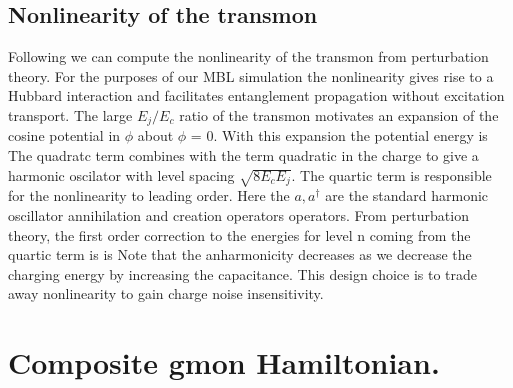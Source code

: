 \subsection{Nonlinearity of the transmon}
Following \cite{Koch2007, JimmyThesis} we can compute the nonlinearity of the transmon from perturbation theory.
For the purposes of our MBL simulation the nonlinearity gives rise to a Hubbard interaction and facilitates entanglement propagation without excitation transport.
The large $E_j / E_c$ ratio of the transmon motivates an expansion of the cosine potential in $\phi$ about $\phi$ = 0.
With this expansion the potential energy is
The quadratc term combines with the term quadratic in the charge to give a harmonic oscilator with level spacing $\sqrt{8 E_cE_j}$.
The quartic term is responsible for the nonlinearity to leading order.
Here the $a,a^\dagger$ are the standard harmonic oscillator annihilation and creation operators operators.
From perturbation theory, the first order correction to the energies for level n coming from the quartic term is is
Note that the anharmonicity decreases as we decrease the charging energy by increasing the capacitance.
This design choice is to trade away nonlinearity to gain charge noise insensitivity.


\section{Composite gmon Hamiltonian.}


